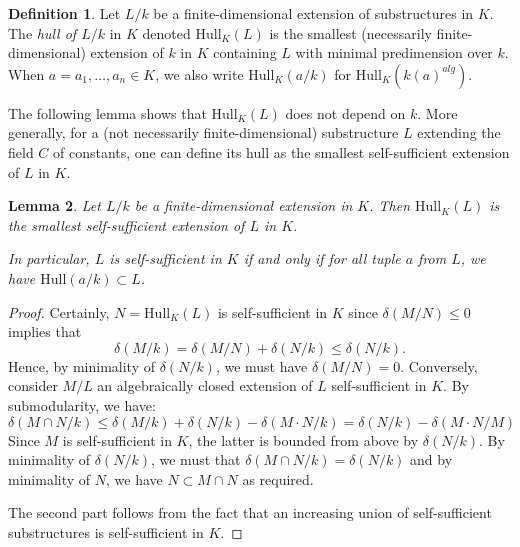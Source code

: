 \documentclass[12pt]{amsart}
\theoremstyle{definition}
\newtheorem{defn}{Definition}[section]
\theoremstyle{plain}
\newtheorem{lem}[defn]{Lemma}
\theoremstyle{exampstyle}\newtheorem{thmx}{Theorem}
\theoremstyle{exampstyle}\newtheorem{thmxbis}{Theorem}
\begin{document}
 
 
 \begin{defn} 
Let $L/k$ be a finite-dimensional extension of substructures in $K$. The {\em hull of $L/k$} in $K$ denoted $\mathrm{Hull}_K(L)$ is the smallest (necessarily finite-dimensional) extension of $k$ in $K$ containing $L$ with minimal predimension over $k$. When $a = a_1,\ldots, a_n \in K$, we also write $\mathrm{Hull}_K(a/k)$ for $\mathrm{Hull}_K(k(a)^{alg})$.
\end{defn}

The following lemma shows that $\mathrm{Hull}_K(L)$ does not depend on $k$. More generally, for a (not necessarily finite-dimensional) substructure $L$ extending the field $C$ of constants, one can define its hull as the smallest self-sufficient extension of $L$ in $K$. 

\begin{lem} \label{lemma-self-sufficient}
Let $L/k$ be a finite-dimensional extension in $K$. Then $\mathrm{Hull}_K(L)$ is the smallest self-sufficient extension of $L$ in $K$. 

In particular, $L$ is self-sufficient in $K$ if and only if for all tuple $a$ from $L$, we have $\mathrm{Hull}(a/k) \subset L$.
\end{lem} 


\begin{proof} 
Certainly, $N = \mathrm{Hull}_K(L)$ is self-sufficient in $K$ since $\delta(M/N) \leq 0$ implies that $$\delta(M/k) = \delta(M/N) + \delta(N/k) \leq \delta(N/k).$$
Hence, by minimality of $\delta(N/k)$, we must have $\delta(M/N) = 0$. Conversely, consider $M/L$ an algebraically closed extension of $L$ self-sufficient in $K$. By submodularity, we have:
$$\delta(M \cap N /k)  \leq \delta(M/k) + \delta(N/k) - \delta(M \cdot N/k) = \delta(N/k) - \delta(M \cdot N/M)$$
Since $M$ is self-sufficient in $K$, the latter is bounded from above by $\delta(N/k)$. By minimality of $\delta(N/k)$, we must that $\delta(M\cap N/k) = \delta(N/k)$ and by minimality of $N$, we have $N \subset M \cap N$ as required.

The second part follows from the fact that an increasing union of self-sufficient substructures is self-sufficient in $K$.
\end{proof} 
\end{document}
